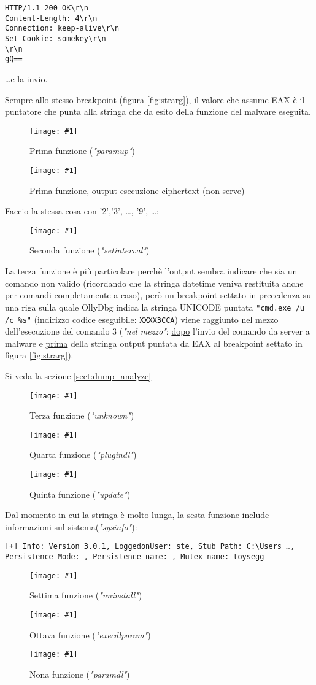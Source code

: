 \documentclass[
    a4paper, %
    11pt %
]{article}
\newcommand{\pic}[4]{\begin{figure}[H]
            \centering
            \texttt{[image: \#1]}
            \caption{#2}
            \label{fig:#1}
            \end{figure}}
\begin{document}
            \begin{lstlisting}
HTTP/1.1 200 OK\r\n
Content-Length: 4\r\n
Connection: keep-alive\r\n
Set-Cookie: somekey\r\n
\r\n
gQ==
            \end{lstlisting}

            \dots e la invio.

            Sempre allo stesso breakpoint (figura \ref{fig:strarg}), il valore che assume EAX è il puntatore che 
            punta alla stringa che da esito della funzione del malware eseguita.

            \pic{fn1}{Prima funzione (\textit{"paramup"})}{19cm}{2cm}

            \pic{fn1enc}{Prima funzione, output esecuzione ciphertext (non serve)}{19cm}{2cm}

            Faccio la stessa cosa con '2','3', \dots, '9', \dots:

            \pic{fn2}{Seconda funzione (\textit{"setinterval"})}{19cm}{2cm}

            La terza funzione è più particolare perchè l'output sembra indicare che sia un comando non valido (ricordando che la stringa datetime veniva restituita anche per comandi completamente a caso),
            però un breakpoint settato in precedenza su una riga sulla quale OllyDbg indica la stringa UNICODE
            puntata \texttt{"cmd.exe /u /c \%s"} (indirizzo codice eseguibile: \texttt{XXXX3CCA}) viene 
            raggiunto nel mezzo dell'esecuzione del comando 3 (\textit{"nel mezzo"}: \underline{dopo} l'invio del comando da 
            server a malware e \underline{prima} della stringa output puntata da EAX al breakpoint settato in figura \ref{fig:strarg}).
            
            Si veda la sezione \ref{sect:dump_analyze}
            
            \pic{fn3}{Terza funzione (\textit{"unknown"})}{11.5cm}{1.5cm}
            \pic{fn4}{Quarta funzione (\textit{"plugindl"})}{19cm}{1.5cm}
            \pic{fn5}{Quinta funzione (\textit{"update"})}{18cm}{1.5cm}

            Dal momento in cui la stringa è molto lunga, la sesta funzione include informazioni sul 
            sistema(\textit{"sysinfo"}):

            \texttt{[+] Info: Version 3.0.1, LoggedonUser: ste, Stub Path: C:\textbackslash Users \dots, 
            Persistence Mode: , Persistence name: , Mutex name: toysegg}

            \pic{fn7}{Settima funzione (\textit{"uninstall"})}{18cm}{2cm}
            \pic{fn8}{Ottava funzione (\textit{"execdlparam"})}{17cm}{2cm}
            \pic{fn9}{Nona funzione (\textit{"paramdl"})}{16cm}{2cm}
\end{document}
